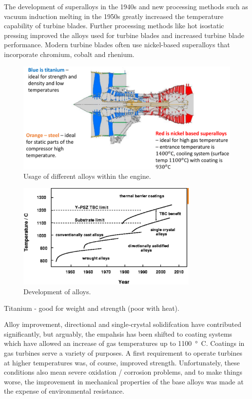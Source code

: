The development of superalloys in the 1940s and new processing methods such as vacuum induction melting in the 1950s greatly increased the temperature capability of turbine blades. Further processing methods like hot isostatic pressing improved the alloys used for turbine blades and increased turbine blade performance. Modern turbine blades often use nickel-based superalloys that incorporate chromium, cobalt and rhenium.
\begin{figure}[H]
    \centering
    \includegraphics[width =\textwidth]{img/figure23.png}
    \caption{Usage of different alloys within the engine.}
\end{figure}
\begin{figure}[H]
    \centering
    \includegraphics[width =0.8\textwidth]{img/figure24.png}
    \caption{Development of alloys.}
\end{figure}
Titanium - good for weight and strength (poor with heat).

Alloy improvement, directional and single-crystal solidifcation have contributed significantly, but arguably, the empahsis has been shifted to coating systems which have allowed an increase of gas temperatures up to \SI{1100}{\degree C}. Coatings in gas turbines serve a variety of purposes. A first requirement to operate turbines at higher temperatures was, of course, improved strength. Unfortunately, these conditions also mean severe oxidation / corrosion problems, and to make things worse, the improvement in mechanical properties of the base alloys was made at the expense of environmental resistance. 


